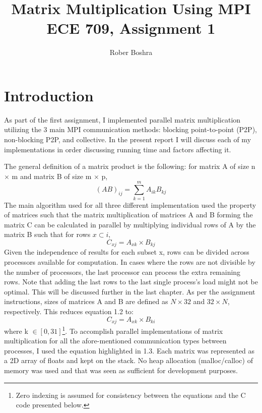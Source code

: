 \documentclass[12pt]{report}
\author{Rober Boshra}
\title{Matrix Multiplication Using MPI\\ECE 709, Assignment 1}
\begin{document}
 

\maketitle
\chapter{Introduction}
As part of the first assignment, I implemented parallel matrix multiplication utilizing the 3 main MPI communication methods: blocking point-to-point (P2P), non-blocking P2P, and collective. In the present report I will discuss each of my implementations in order discussing running time and factors affecting it.

The general definition of a matrix product is the following: for matrix A of size n $\times$ m and matrix B of size m $\times$ p, 
\begin{equation}
(AB)_{ij}=\sum\limits_{k=1}^m A_{ik}B_{kj}
\end{equation}
The main algorithm used for all three different implementation used the property of matrices such that the matrix multiplication of matrices A and B forming the matrix C can be calculated in parallel by multiplying individual rows of A by the matrix B such that for rows $x \subset i$,
\begin{equation}
C_{xj} = A_{xk} \times B_{kj}
\end{equation}
Given the independence of results for each subset x, rows can be divided across processors available for computation. In cases where the rows are not divisible by the number of processors, the last processor can process the extra remaining rows. Note that adding the last rows to the last single process's load might not be optimal. This will be discussed further in the last chapter. 
As per the assignment instructions, sizes of matrices A and B are defined as $N \times 32$ and $32 \times N$, respectively. This reduces equation 1.2 to:
\begin{equation}
C_{xj} = A_{xk} \times B_{ki}
\end{equation}
where k $\in [0,31]$\footnote{\label{^1}Zero indexing is assumed for consistency between the equations and the C code presented below.}. To accomplish parallel implementations of matrix multiplication for all the afore-mentioned communication types between processes, I used the equation highlighted in 1.3. Each matrix was represented as a 2D array of floats and kept on the stack. No heap allocation (malloc/calloc) of memory was used and that was seen as sufficient for development purposes.
\end{document}
